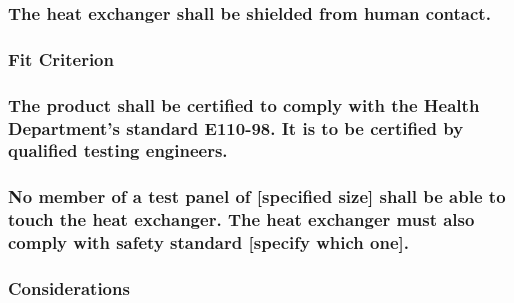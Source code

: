 \documentclass[
]{article}
\begin{document}
\hypertarget{the-heat-exchanger-shall-be-shielded-from-human-contact.}{%
\subsubsection{The heat exchanger shall be shielded from human
contact.}\label{the-heat-exchanger-shall-be-shielded-from-human-contact.}}

\hypertarget{fit-criterion-6}{%
\subsubsection{Fit Criterion}\label{fit-criterion-6}}

\hypertarget{the-product-shall-be-certified-to-comply-with-the-health-departments-standard-e110-98.-it-is-to-be-certified-by-qualified-testing-engineers.}{%
\subsubsection{The product shall be certified to comply with the Health
Department's standard E110-98. It is to be certified by qualified
testing
engineers.}\label{the-product-shall-be-certified-to-comply-with-the-health-departments-standard-e110-98.-it-is-to-be-certified-by-qualified-testing-engineers.}}

\hypertarget{no-member-of-a-test-panel-of-specified-size-shall-be-able-to-touch-the-heat-exchanger.-the-heat-exchanger-must-also-comply-with-safety-standard-specify-which-one.}{%
\subsubsection{No member of a test panel of {[}specified size{]} shall
be able to touch the heat exchanger. The heat exchanger must also comply
with safety standard {[}specify which
one{]}.}\label{no-member-of-a-test-panel-of-specified-size-shall-be-able-to-touch-the-heat-exchanger.-the-heat-exchanger-must-also-comply-with-safety-standard-specify-which-one.}}

\hypertarget{considerations-26}{%
\subsubsection{Considerations}\label{considerations-26}}
\end{document}
